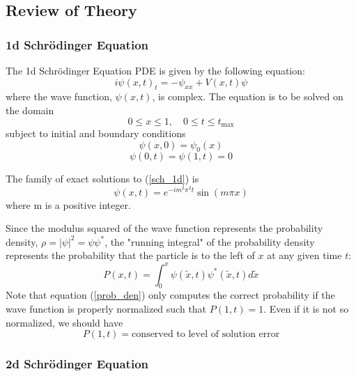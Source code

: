 \documentclass[10pt]{article}
\begin{document}
\subsection*{Review of Theory}

\subsubsection*{1d Schrödinger Equation}

The 1d Schrödinger Equation PDE is given by the following equation:
\begin{equation}\label{sch_1d}
i\psi(x,t)_t = -\psi_{xx} + V(x,t)\psi
\end{equation}
where the wave function, $\psi(x,t)$, is complex. The equation is to be solved on the domain
$$0\leq x \leq 1, \quad 0 \leq t \leq t_{\textrm{max}}$$
subject to initial and boundary conditions
\begin{equation}\label{sch_1d_IC}
\psi(x,0) = \psi_0(x)
\end{equation}
\begin{equation}\label{sch_1d_BC}
\psi(0,t) = \psi(1,t) = 0
\end{equation}

The family of exact solutions to (\ref{sch_1d}) is
\begin{equation}\label{1d_exact_soln}
\psi(x,t) = e^{-i m^2 \pi^2 t} \sin(m \pi x)
\end{equation}
where m is a positive integer. 

Since the modulus squared of the wave function represents the probability density, 
$\rho = |\psi|^2 = \psi \psi^*$, the "running integral" of the probability density represents
the probability that the particle is to the left of $x$ at any given time $t$:
\begin{equation}\label{prob_den}
P(x,t) = \int_0^x \psi(\tilde{x}, t) \psi^*(\tilde{x}, t) d\tilde{x}
\end{equation}
Note that equation (\ref{prob_den}) only computes the correct probability if the wave function is properly 
normalized such that $P(1,t) = 1$. Even if it is not so normalized, we should have
$$P(1,t) = \textrm{conserved to level of solution error}$$

\subsubsection*{2d Schrödinger Equation}
\end{document}
